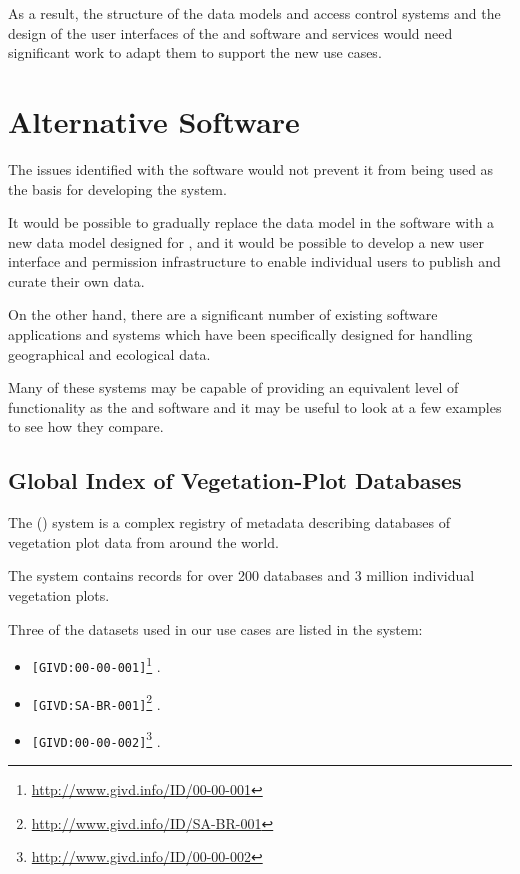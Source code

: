 \documentclass{article}
\begin{document}
As a result, the structure of the data models and access control systems
and the design of the user interfaces of the \cite{ivoa} and \cite{astro}
software and services would need significant work to adapt them to support the new use cases. 

\section{Alternative Software}

The issues identified with the \cite{ivoa} software would not prevent it
from being used as the basis for developing the \cite{atrop} system.

It would be possible to gradually replace the \cite{ivoa-obscore} data model
in the \cite{ivoa} software with a new data model designed for \cite{atrop},
and it would be possible to develop a new user interface and permission
infrastructure to enable individual users to publish and curate their
own data.

On the other hand, there are a significant number of existing software
applications and systems which have been specifically designed for handling
geographical and ecological data.

Many of these systems may be capable of providing an equivalent level
of functionality as the \cite{ivoa} and \cite{astro} software and it
may be useful to look at a few examples to see how they compare.

\subsection{Global Index of Vegetation-Plot Databases}

The  (\cite{givd}) system is a complex registry of metadata
describing databases of vegetation plot data from around the world.

The \cite{givd} system contains records for over 200 databases and 3 million
individual vegetation plots.

Three of the datasets used in our use cases are listed in the \cite{givd}
system:

\begin{itemize}
    \item \texttt{[GIVD:00-00-001]}\footnote{\url{http://www.givd.info/ID/00-00-001}} \cite{forest-plots}.
    \item \texttt{[GIVD:SA-BR-001]}\footnote{\url{http://www.givd.info/ID/SA-BR-001}} \cite{ppbio}.
    \item \texttt{[GIVD:00-00-002]}\footnote{\url{http://www.givd.info/ID/00-00-002}} \cite{team}.
\end{itemize}
\end{document}
